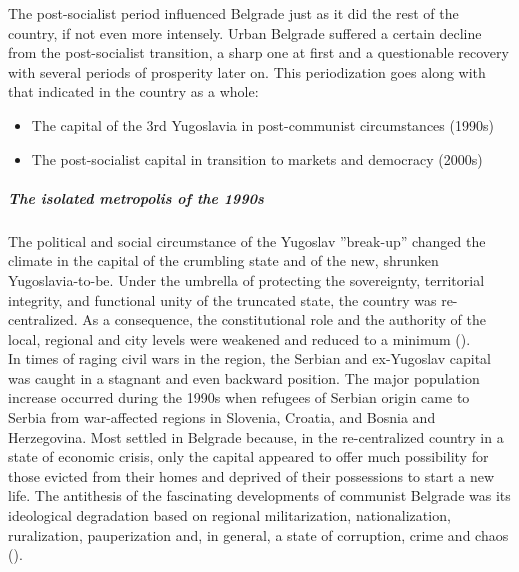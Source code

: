 \documentclass[11pt]{report}
\begin{document}
{{{{The post-socialist period influenced Belgrade just as it did the rest of the country, if not even more intensely. Urban Belgrade suffered a certain decline from the post-socialist transition, a sharp one at first and a questionable recovery with several periods of prosperity later on. This periodization goes along with that indicated in the country as a whole:

\begin{itemize}
\item The capital of the 3rd Yugoslavia in post-communist circumstances (1990s)
\item The post-socialist capital in transition to markets and democracy (2000s)
\end{itemize}

\subparagraph{The isolated metropolis of the 1990s}

The political and social circumstance of the Yugoslav ”break-up” changed the climate in the capital of the crumbling state and of the new, shrunken Yugoslavia-to-be. Under the umbrella of protecting the sovereignty, territorial integrity, and functional unity of the truncated state, the country was re-centralized. As a consequence, the constitutional role and the authority of the local, regional and city levels were weakened and reduced to a minimum (\href{Vujosevic}{\citealt{vujosevic_regionalizam_2015}}). 
\\

In times of raging civil wars in the region, the Serbian and ex-Yugoslav capital was caught in a stagnant and even backward position. The major population increase occurred during the 1990s when refugees of Serbian origin came to Serbia from war-affected regions in Slovenia, Croatia, and Bosnia and Herzegovina. Most settled in Belgrade because, in the re-centralized country in a state of economic crisis, only the capital appeared to offer much possibility for those evicted from their homes and deprived of their possessions to start a new life.
The antithesis of the fascinating developments of communist Belgrade was its ideological degradation based on regional militarization, nationalization, ruralization, pauperization and, in general, a state of corruption, crime and chaos (\href{Samardzic}{\citealt{doytchinov_belgrade_2015}}). 
\\

}}}}
\end{document}
